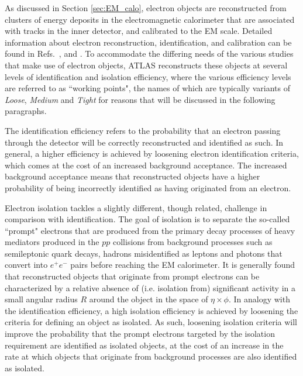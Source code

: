 As discussed in Section \ref{sec:EM_calo}, electron objects are reconstructed from clusters of energy deposits in the electromagnetic calorimeter that are associated with tracks in the inner detector, and calibrated to the EM scale. Detailed information about electron reconstruction, identification, and calibration can be found in Refs.~\cite{ATL-PHYS-PUB-2017-022}, \cite{PERF-2017-01} and \cite{PERF-2017-03}. To accommodate the differing needs of the various studies that make use of electron objects, ATLAS reconstructs these objects at several levels of identification and isolation efficiency, where the various efficiency levels are referred to as ``working points", the names of which are typically variants of \emph{Loose}, \emph{Medium} and \emph{Tight} for reasons that will be discussed in the following paragraphs.

The identification efficiency refers to the probability that an electron passing through the detector will be correctly reconstructed and identified as such. In general, a higher efficiency is achieved by loosening electron identification criteria, which comes at the cost of an increased background acceptance. The increased background acceptance means that reconstructed objects have a higher probability of being incorrectly identified as having originated from an electron. 

Electron isolation tackles a slightly different, though related, challenge in comparison with identification. The goal of isolation is to separate the so-called ``prompt" electrons that are produced from the primary decay processes of heavy mediators produced in the \(pp\) collisions from background processes such as semileptonic quark decays, hadrons misidentified as leptons and photons that convert into \(e^+e^-\) pairs before reaching the EM calorimeter. It is generally found that reconstructed objects that originate from prompt electrons can be characterized by a relative absence of (i.e. isolation from) significant activity in a small angular radius \(R\) around the object in the space of \(\eta\times\phi\). In analogy with the identification efficiency, a high isolation efficiency is achieved by loosening the criteria for defining an object as isolated. As such, loosening isolation criteria will improve the probability that the prompt electrons targeted by the isolation requirement are identified as isolated objects, at the cost of an increase in the rate at which objects that originate from background processes are also identified as isolated.
 
